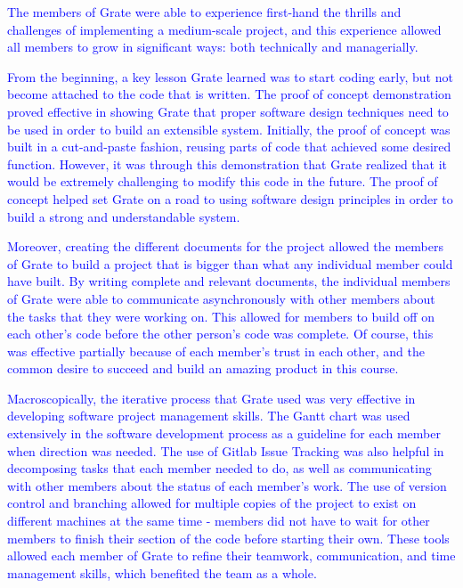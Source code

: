 \documentclass{article}
\begin{document}
\textcolor{blue}{The members of Grate were able to experience first-hand the 
thrills and 
challenges of implementing a medium-scale project, and this experience allowed 
all members to grow in significant ways: both technically and managerially. }

\textcolor{blue}{From the beginning, a key lesson Grate learned was to start 
coding early, but 
not become attached to the code that is written. The proof of concept 
demonstration proved effective in showing Grate that proper software design 
techniques need to be used in order to build an extensible system. Initially, 
the proof of concept was built in a cut-and-paste fashion, reusing parts of code 
that achieved some desired function. However, it was through this demonstration 
that Grate realized that it would be extremely challenging to modify this code 
in the future. The proof of concept helped set Grate on a road to using software 
design principles in order to build a strong and understandable system.}

\textcolor{blue}{Moreover, creating the different documents for the project 
allowed the members 
of Grate to build a project that is bigger than what any individual member could 
have built. By writing complete and relevant documents, the individual members 
of Grate were able to  communicate asynchronously with other members about the 
tasks that they were working on. This allowed for members to build off on each 
other's code before the other person's code was complete. Of course, this was 
effective partially because of each member's trust in each other, and the common 
desire to succeed and build an amazing product in this course.}

\textcolor{blue}{Macroscopically, the iterative process that Grate used was very 
effective in 
developing software project management skills. The Gantt chart was used 
extensively in the software development process as a guideline for each member 
when direction was needed. The use of Gitlab Issue Tracking was also helpful in 
decomposing tasks that each member needed to do, as well as communicating with 
other members about the status of each member's work. The use of version control 
and branching allowed for multiple copies of the project to exist on different 
machines at the same time - members did not have to wait for other members to 
finish their section of the code before starting their own. These tools allowed 
each member of Grate to refine their teamwork, communication, and time 
management skills, which benefited the team as a whole.}
\end{document}
